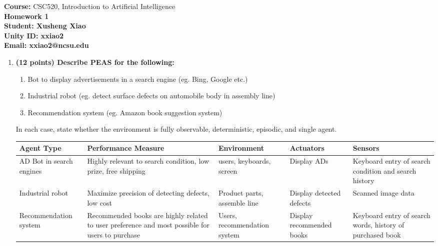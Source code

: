 \documentclass{article}%
\begin{document}
\begin{flushleft}
\textbf{Course:} CSC520, Introduction to Artificial Intelligence\\
\textbf{Homework 1}\\
\textbf{Student: Xusheng Xiao} \\
\textbf{Unity ID: xxiao2} \\
\textbf{Email: xxiao2@ncsu.edu}
\end{flushleft}

\noindent{\hrulefill}

\bigskip

\begin{enumerate}
	\item \textbf{ (12 points) Describe PEAS for the following:}
	\begin{enumerate}
	\item Bot to display advertisements in a search engine (eg. Bing, Google etc.)
	\item Industrial robot (eg. detect surface defects on automobile body in assembly line)
	\item Recommendation system (eg. Amazon book suggestion system)
	\end{enumerate}
     
     In each case, state whether the environment is fully observable, deterministic, episodic, and single agent. \\
     

	\begin{tabular}{|p{2.5cm}|p{2.5cm}|p{2.5cm}|p{2cm}|p{2cm}|}
	\hline  \textbf{Agent Type} &  \textbf{Performance Measure }&  \textbf{Environment }& \textbf{Actuators }& \textbf{Sensors}  \\ 
	\hline  AD Bot in search engines &  Highly relevant to search condition, low prize, free shipping &  users, keyboards,  screen & Display ADs  & Keyboard entry of search condition and search history\\ 
	\hline  Industrial robot  & Maximize precision of detecting defects, low cost & Product parts, assemble line & Display detected defects & Scanned image data \\ 
	\hline  Recommendation system &  Recommended books are highly related to user preference and most possible for users to purchase  &  Users, recommendation system & Display recommended books  &Keyboard entry of search words, history of purchased book\\ 
	\hline 
	\end{tabular} 
	

\end{enumerate}
\end{document}
